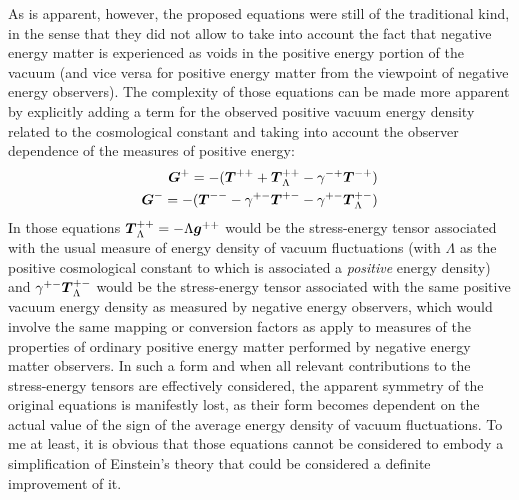 \documentclass[notitlepage,12pt]{report}
\newcommand{\bm}[1]{\mbox{\boldmath $#1$}}
\begin{document}
As is apparent, however, the proposed equations were still of the traditional kind, in the sense that they did not allow to take into account the fact that negative energy matter is experienced as voids in the positive energy portion of the vacuum (and vice versa for positive energy matter from the viewpoint of negative energy observers). The complexity of those equations can be made more apparent by explicitly adding a term for the observed positive vacuum energy density related to the cosmological constant and taking into account the observer dependence of the measures of positive energy:
\begin{eqnarray}\label{eq:2.7}
\bm{G}^+=-(\bm{T}^{++}+\bm{T}_{\Lambda}^{++}-\gamma^{-+}\bm{T}^{-+}) \\
\bm{G}^-=-(\bm{T}^{--}-\gamma^{+-}\bm{T}^{+-}-\gamma^{+-}\bm{T}_{\Lambda}^{+-}) \nonumber
\end{eqnarray}
In those equations $\bm{T}_{\Lambda}^{++}=-\Lambda\bm{g}^{++}$ would be the stress-energy tensor associated with the usual measure of energy density of vacuum fluctuations (with $\Lambda$ as the positive cosmological constant to which is associated a \textit{positive} energy density) and $\gamma^{+-}\bm{T}_{\Lambda}^{+-}$ would be the stress-energy tensor associated with the same positive vacuum energy density as measured by negative energy observers, which would involve the same mapping or conversion factors as apply to measures of the properties of ordinary positive energy matter performed by negative energy matter observers. In such a form and when all relevant contributions to the stress-energy tensors are effectively considered, the apparent symmetry of the original equations is manifestly lost, as their form becomes dependent on the actual value of the sign of the average energy density of vacuum fluctuations. To me at least, it is obvious that those equations cannot be considered to embody a simplification of Einstein's theory that could be considered a definite improvement of it.
\end{document}
